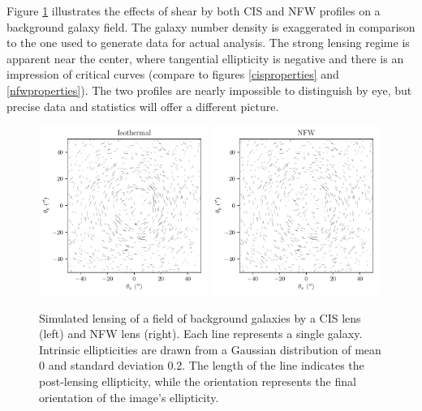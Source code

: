 \documentclass[10pt]{article}
\begin{document}
Figure \ref{ellipticityexample} illustrates the effects of shear by both CIS and NFW profiles on a background galaxy field. The galaxy number density is exaggerated in comparison to the one used to generate data for actual analysis. The strong lensing regime is apparent near the center, where tangential ellipticity is negative and there is an impression of critical curves (compare to figures \ref{cisproperties} and \ref{nfwproperties}). The two profiles are nearly impossible to distinguish by eye, but precise data and statistics will offer a different picture.

\begin{figure}
    \centering
    \includegraphics[width=0.49\textwidth]{isothermalellipticities.pdf}
    \includegraphics[width=0.49\textwidth]{nfwellipticities.pdf}
    \caption{Simulated lensing of a field of background galaxies by a CIS lens (left) and NFW lens (right). Each line represents a single galaxy. Intrinsic ellipticities are drawn from a Gaussian distribution of mean 0 and standard deviation 0.2. The length of the line indicates the post-lensing ellipticity, while the orientation represents the final orientation of the image's ellipticity.}
    \label{ellipticityexample}
\end{figure}
\end{document}
